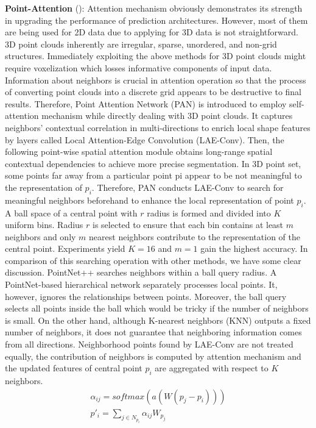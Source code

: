 \textbf{Point-Attention} (\textcolor{cyan}{\cite{feng2020point}}):
Attention mechanism obviously demonstrates its strength in upgrading the performance of prediction architectures. However, most of them are being used for 2D data due to applying for 3D data is not straightforward. 3D point clouds inherently are irregular, sparse, unordered, and non-grid structures. Immediately exploiting the above methods for 3D point clouds might require voxelization which losses informative components of input data. Information about neighbors is crucial in attention operation so that the process of converting point clouds into a discrete grid appears to be destructive to final results. Therefore, Point Attention Network (PAN) is introduced to employ self-attention mechanism while directly dealing with 3D point clouds. It captures neighbors’ contextual correlation in multi-directions to enrich local shape features by layers called Local Attention-Edge Convolution (LAE-Conv). Then, the following point-wise spatial attention module obtains long-range spatial contextual dependencies to achieve more precise segmentation. In 3D point set, some points far away from a particular point pi appear to be not meaningful to the representation of $p_i$. Therefore, PAN conducts LAE-Conv to search for meaningful neighbors beforehand to enhance the local representation of point $p_i$. A ball space of a central point with $r$ radius is formed and divided into $K$ uniform bins. Radius $r$ is selected to ensure that each bin contains at least $m$ neighbors and only $m$ nearest neighbors contribute to the representation of the central point. Experiments yield $K=16$ and $m=1$ gain the highest accuracy. In comparison of this searching operation with other methods, we have some clear discussion. PointNet++ searches neighbors within a ball query radius. A PointNet-based hierarchical network separately processes local points. It, however, ignores the relationships between points. Moreover, the ball query selects all points inside the ball which would be tricky if the number of neighbors is small. On the other hand, although K-nearest neighbors (KNN) outputs a fixed number of neighbors, it does not guarantee that neighboring information comes from all directions. Neighborhood points found by LAE-Conv are not treated equally, the contribution of neighbors is computed by attention mechanism and the updated features of central point $p_i$ are aggregated with respect to $K$ neighbors.
\begin{gather}
\label{eq:alpha_point_attention}
\alpha_{ij}= softmax(a(W(p_j - p_i))) \\
\label{eq:p_i_point_attention}
p'_i = \sum_{j \in N_{p_i}} \alpha_{ij} W_{p_j}\
\end{gather}

